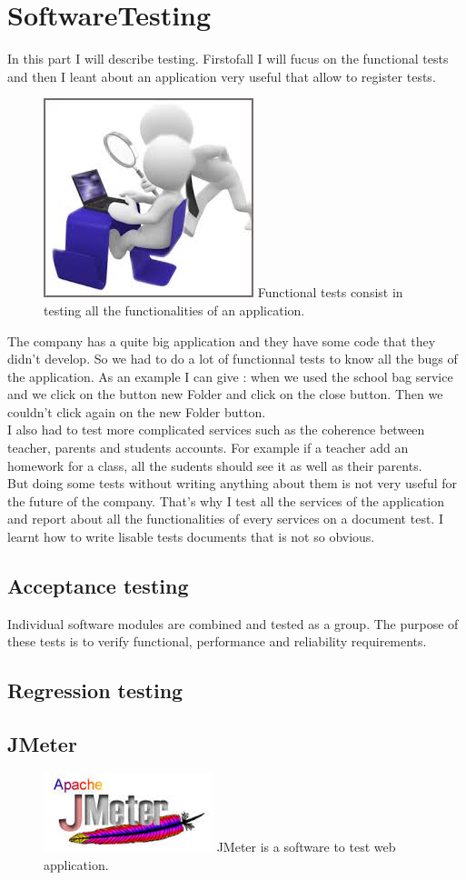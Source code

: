
\section{SoftwareTesting}
	 In this part I will describe testing. Firstofall I will fucus on the functional tests and then I leant about an application very useful that allow to register tests. \\

	\begin{figure}[h]
		\includegraphics[scale=0.2]{Images/testing.jpeg}
		Functional tests consist in testing all the functionalities of an application.
	\end{figure}
The company has a quite big application and they have some code that they didn't develop. So we had to do a lot of functionnal tests to know all
the bugs of the application. 
As an example I can give : when we used the school bag service and we click on the button new Folder and click on the close button. Then we couldn't
click again on the new Folder button. \\
I also had to test more complicated services such as the coherence between 
teacher, parents and students accounts. For example if a teacher add
an homework for a class, all the sudents should see it as well as their parents. \\
But doing some tests without writing anything about them is not very useful for the future of the company. That's why I test all the services of the application and report about all the functionalities of every services on a 
document test. I learnt how to write lisable tests documents that is not so obvious.  

\subsection{Acceptance testing}
Individual software modules are combined and tested as a group. The purpose
of these tests is to verify functional, performance and reliability requirements. 

\subsection{Regression testing}



\subsection{JMeter}
\begin{figure}[h]
	\includegraphics[scale=0.5]{Images/JMeter.jpeg}
	JMeter is a software to test web application.
\end{figure}


